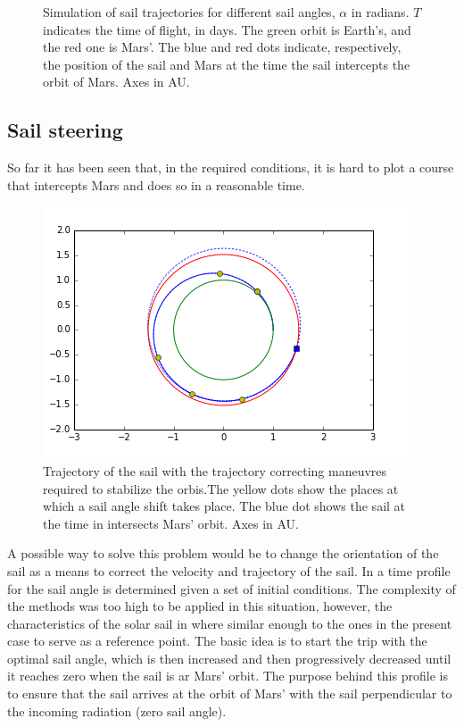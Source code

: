 \documentclass[twocolumn,12pt,a4paper]{article}
\numberwithin{equation}{section}
\begin{document}
\begin{figure}
	\caption{Simulation of sail trajectories for different sail angles, \( \alpha \) in radians. \( T \) indicates the time of flight, in days. The green orbit is Earth's, and the red one is Mars'. The blue and red dots indicate, respectively, the position of the sail and Mars at the time the sail intercepts the orbit of Mars. Axes in AU.}
	\label{fig:espirals}
\end{figure}

\subsection{Sail steering}
So far it has been seen that, in the required conditions, it is hard to plot a course that intercepts Mars and does so in a reasonable time.

\begin{figure}
	\centering
	\label{fig:maniobres}
	\includegraphics[scale=0.55]{Maniobres.png}
	\caption{Trajectory of the sail with the trajectory correcting maneuvres required to stabilize the orbis.The yellow dots show the places at which a sail angle shift takes place. The blue dot shows the sail at the time in intersects Mars' orbit. Axes in AU.}
\end{figure}

A possible way to solve this problem would be to change the orientation of the sail as a means to correct the velocity and trajectory of the sail. In \cite{xinos} a time profile for the sail angle is determined given a set of initial conditions. The complexity of the methods was too high to be applied in this situation, however, the characteristics of the solar sail in \cite{xinos} where similar enough to the ones in the present case to serve as a reference point. The basic idea is to start the trip with the optimal sail angle, which is then increased and then progressively decreased until it reaches zero when the sail is ar Mars' orbit. The purpose behind this profile is to ensure that the sail arrives at the orbit of Mars' with the sail perpendicular to the incoming radiation (zero sail angle).
\end{document}

